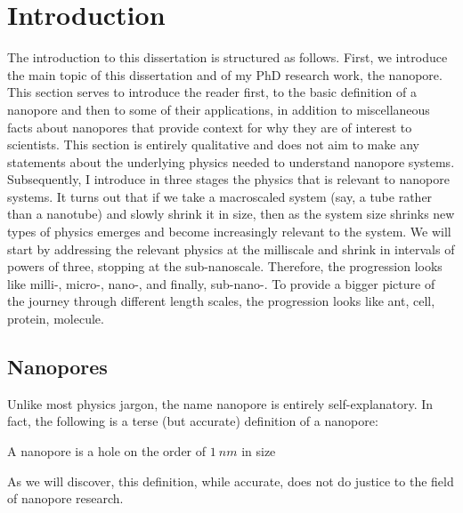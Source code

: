 \graphicspath{{../images/ch1/}}	%


\chapter{Introduction}
\label{chap:intro}


	The introduction to this dissertation is structured as follows. First, we introduce the main topic of this dissertation and of my PhD research work, the nanopore. This section serves to introduce the reader first, to the basic definition of a nanopore and then to some of their applications, in addition to miscellaneous facts about nanopores that provide context for why they are of interest to scientists. This section is entirely qualitative and does not aim to make any statements about the underlying physics needed to understand nanopore systems. Subsequently, I introduce in three stages the physics that is relevant to nanopore systems. It turns out that if we take a macroscaled system (say, a tube rather than a nanotube) and slowly shrink it in size, then as the system size shrinks new types of physics emerges and become increasingly relevant to the system. We will start by addressing the relevant physics at the milliscale and shrink in intervals of powers of three, stopping at the sub-nanoscale. Therefore, the progression looks like milli-, micro-, nano-, and finally, sub-nano-. To provide a bigger picture of the journey through different length scales, the progression looks like ant, cell, protein, molecule.

	\section{Nanopores}

		Unlike most physics jargon, the name nanopore is entirely self-explanatory. In fact, the following is a terse (but accurate) definition of a nanopore:


		\begin{definition} \label{def:nanopore}
			A nanopore is a hole on the order of $\SI{1}{nm}$ in size
		\end{definition}


		As we will discover, this definition, while accurate, does not do justice to the field of nanopore research. 

